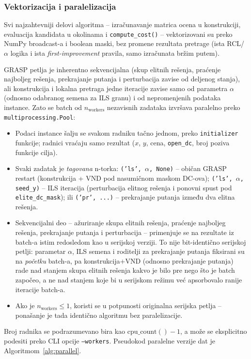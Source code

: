 \documentclass[12pt,a4paper]{article}
\begin{document}
\subsubsection{Vektorizacija i paralelizacija}
\label{sec:vektorizacija}

Svi najzahtevniji delovi algoritma -- izračunavanje matrica ocena u konstrukciji,
evaluacija kandidata u okolinama i \texttt{compute\_cost()} -- vektorizovani
su preko NumPy broadcast-a i boolean maski, bez promene rezultata pretrage
(ista RCL/$\alpha$ logika i ista \textit{first-improvement} pravila, samo
izračunata bržim putem).

GRASP petlja je inherentno sekvencijalna (skup elitnih rešenja, praćenje
najboljeg rešenja, prekrajanje putanja i perturbacija zavise od deljenog stanja),
ali konstrukcija i lokalna pretraga jedne iteracije zavise samo od parametra
$\alpha$ (odnosno odabranog semena za ILS granu) i od nepromenjenih podataka
instance. Zato se batch od $n_{\text{workers}}$ nezavisnih zadataka izvršava
paralelno preko \texttt{multiprocessing.Pool}:
\begin{itemize}
  \item Podaci instance šalju se svakom radniku tačno jednom, preko
    \texttt{initializer} funkcije; radnici vraćaju samo rezultat ($x$, $y$,
    cena, \texttt{open\_dc}, broj poziva funkcije cilja).
  \item Svaki zadatak je \textit{tagovana} n-torka: \texttt{('ls', $\alpha$,
    None)} -- običan GRASP restart (konstrukcija + VND pod nasumičnom maskom
    DC-ova); \texttt{('ls', $\alpha$, seed\_y)} -- ILS iteracija (perturbacija
    elitnog rešenja i ponovni spust pod \texttt{elite\_dc\_mask}); ili
    \texttt{('pr', ...)} -- prekrajanje putanja između dva elitna rešenja.
  \item Sekvencijalni deo -- ažuriranje skupa elitnih rešenja, praćenje
    najboljeg rešenja, prekrajanje putanja i perturbacija -- primenjuje se na
    rezultate iz batch-a istim redosledom kao u serijskoj verziji. To nije
    bit-identično serijskoj petlji: parametar $\alpha$, ILS semena i roditelji
    za prekrajanje putanja fiksirani su na \textit{početku} batch-a, pa
    konstrukcija$+$VND (odnosno prekrajanje putanja) rade nad stanjem skupa
    elitnih rešenja kakvo je bilo pre nego što je batch započeo, a ne nad
    stanjem koje bi u serijskom režimu već apsorbovalo ranije iteracije
    batch-a.
  \item Ako je $n_{\text{workers}} \le 1$, koristi se u potpunosti originalna
    serijska petlja -- ponašanje je tada identično algoritmu bez
    paralelizacije.
\end{itemize}
Broj radnika se podrazumevano bira kao $\text{cpu\_count}()-1$, a može se
eksplicitno podesiti preko CLI opcije \texttt{--workers}. Pseudokod paralelne
verzije dat je Algoritmom~\ref{alg:parallel}.
\end{document}
